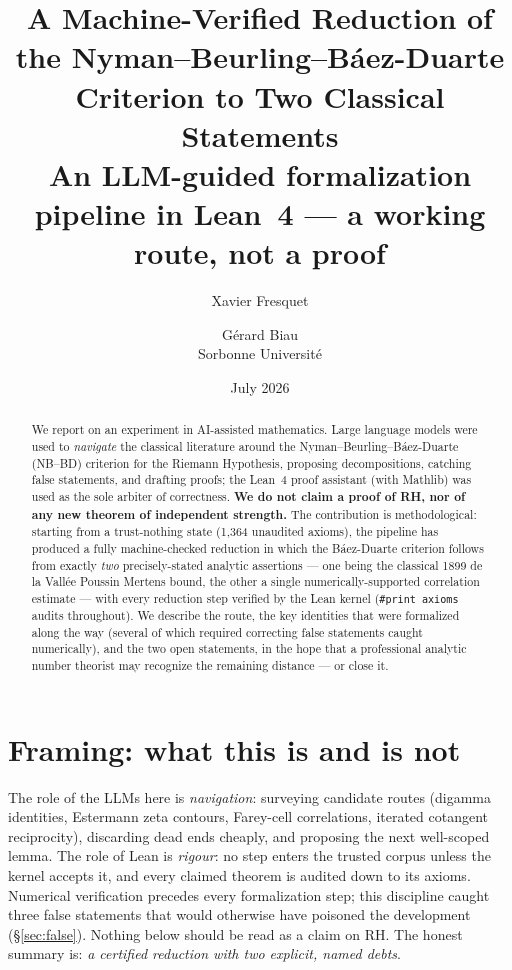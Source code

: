 \documentclass[11pt,a4paper]{article}
\title{A Machine-Verified Reduction of the Nyman--Beurling--B\'aez-Duarte
Criterion to Two Classical Statements\\[1ex]
\large An LLM-guided formalization pipeline in Lean~4 --- a working route, not a proof}
\author{Xavier Fresquet \and G\'erard Biau\\[0.5ex]
\small Sorbonne Universit\'e}
\date{July 2026}
\begin{document}
\maketitle

\begin{abstract}
We report on an experiment in AI-assisted mathematics. Large language models
were used to \emph{navigate} the classical literature around the
Nyman--Beurling--B\'aez-Duarte (NB--BD) criterion for the Riemann Hypothesis,
proposing decompositions, catching false statements, and drafting proofs;
the Lean~4 proof assistant (with Mathlib) was used as the sole arbiter of
correctness. \textbf{We do not claim a proof of RH, nor of any new theorem of
independent strength.} The contribution is methodological: starting from a
trust-nothing state (1{,}364 unaudited axioms), the pipeline has produced a
fully machine-checked reduction in which the B\'aez-Duarte criterion follows
from exactly \emph{two} precisely-stated analytic assertions --- one being the
classical 1899 de la Vall\'ee Poussin Mertens bound, the other a single
numerically-supported correlation estimate --- with every reduction step
verified by the Lean kernel (\texttt{\#print axioms} audits throughout).
We describe the route, the key identities that were formalized along the way
(several of which required correcting false statements caught numerically),
and the two open statements, in the hope that a professional analytic number
theorist may recognize the remaining distance --- or close it.
\end{abstract}

\section{Framing: what this is and is not}
The role of the LLMs here is \emph{navigation}: surveying candidate routes
(digamma identities, Estermann zeta contours, Farey-cell correlations,
iterated cotangent reciprocity), discarding dead ends cheaply, and proposing
the next well-scoped lemma. The role of Lean is \emph{rigour}: no step enters
the trusted corpus unless the kernel accepts it, and every claimed theorem is
audited down to its axioms. Numerical verification precedes every
formalization step; this discipline caught three false statements that would
otherwise have poisoned the development (\S\ref{sec:false}).
Nothing below should be read as a claim on RH. The honest summary is:
\emph{a certified reduction with two explicit, named debts}.
\end{document}
